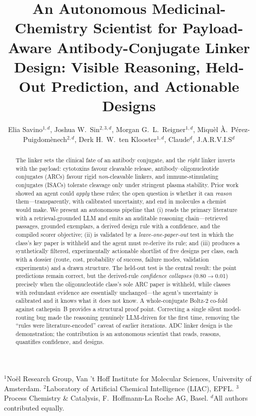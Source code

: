 \documentclass[10pt]{article}
\title{\textbf{An Autonomous Medicinal-Chemistry Scientist for Payload-Aware Antibody-Conjugate Linker Design: Visible Reasoning, Held-Out Prediction, and Actionable Designs}}
\author{Elia Savino$^{1,d}$, Joshua W.\ Sin$^{2,3,d}$, Morgan G.\ L.\ Reigner$^{1,d}$, Miqu\`el \`A.\ P\'erez-Puigdom\`enech$^{2,d}$, Derk H.\ W.\ ten Klooster$^{1,d}$, Claude$^{d}$, J.A.R.V.I.S$^{d}$}
\date{}
\begin{document}
\maketitle
\begin{center}\footnotesize $^{1}$Noël Research Group, Van 't Hoff Institute for Molecular Sciences, University of Amsterdam. $^{2}$Laboratory of Artificial Chemical Intelligence (LIAC), EPFL. $^{3}$Process Chemistry \& Catalysis, F.\ Hoffmann-La Roche AG, Basel. $^{d}$All authors contributed equally.\end{center}
\begin{abstract}The linker sets the clinical fate of an antibody conjugate, and the \emph{right} linker inverts with the payload: cytotoxins favour cleavable release, antibody--oligonucleotide conjugates (ARCs) favour rigid \emph{non}-cleavable linkers, and immune-stimulating conjugates (ISACs) tolerate cleavage only under stringent plasma stability. Prior work showed an agent could \emph{apply} these rules; the open question is whether it can \emph{reason} them---transparently, with calibrated uncertainty, and end in molecules a chemist would make. We present an autonomous pipeline that (i) reads the primary literature with a retrieval-grounded LLM and emits an auditable reasoning chain---retrieved passages, grounded exemplars, a derived design rule with a confidence, and the compiled scorer objective; (ii) is validated by a \emph{leave-one-paper-out} test in which the class's key paper is withheld and the agent must re-derive its rule; and (iii) produces a synthetically filtered, experimentally actionable shortlist of five designs per class, each with a dossier (route, cost, probability of success, failure modes, validation experiments) and a drawn structure. The held-out test is the central result: the point predictions remain correct, but the derived-rule \emph{confidence collapses} (0.80$\rightarrow$0.01) precisely when the oligonucleotide class's sole ARC paper is withheld, while classes with redundant evidence are essentially unchanged---the agent's uncertainty is calibrated and it knows what it does not know. A whole-conjugate Boltz-2 co-fold against cathepsin~B provides a structural proof point. Correcting a single silent model-routing bug made the reasoning genuinely LLM-driven for the first time, removing the ``rules were literature-encoded'' caveat of earlier iterations. ADC linker design is the demonstration; the contribution is an autonomous scientist that reads, reasons, quantifies confidence, and designs.\end{abstract}
\end{document}
